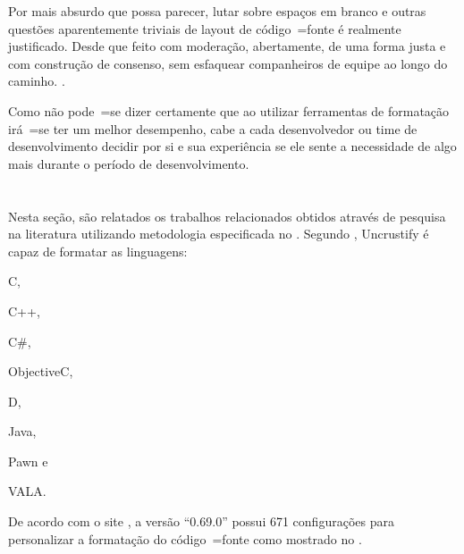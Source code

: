 %
\begin{citacao}
    Por mais absurdo que possa parecer,
    lutar sobre espaços em branco e
    outras questões aparentemente triviais de layout de código~=fonte é realmente justificado.
    Desde que feito com moderação,
    abertamente,
    de uma forma justa e
    com construção de consenso,
    sem esfaquear companheiros de equipe ao longo do caminho.
    \cite[tradução nossa\protect\footnotemark]{deathToTheSpaceInfidels}.
\end{citacao}

Como não pode~=se dizer certamente que ao utilizar ferramentas de formatação irá~=se ter um melhor desempenho,
cabe a cada desenvolvedor ou
time de desenvolvimento decidir por si e
sua experiência se ele sente a necessidade de algo mais durante o período de desenvolvimento.


\section{}
\label{trabalhosRelacionados}

Nesta seção,
são relatados os trabalhos relacionados obtidos através de pesquisa na literatura utilizando metodologia especificada no .
Segundo ,
Uncrustify é capaz de formatar as linguagens:
\begin{inparaenum}[1)] \item C,
\item C++,
\item C\#,
\item ObjectiveC,
\item D,
\item Java,
\item Pawn e
\item VALA.
\end{inparaenum}%
De acordo com o site ,
a versão ``0.69.0'' possui 671 configurações para personalizar a formatação do código~=fonte como mostrado no .

